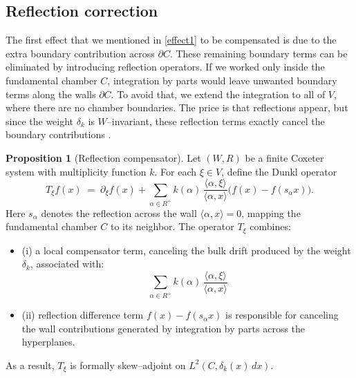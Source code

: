 \documentclass[12pt]{article}
\newcommand{\1}{\mathbbm{1}}
\theoremstyle{definition}
\newtheorem{proposition}{Proposition}
\begin{document}
\subsection{Reflection correction}
The first effect that we mentioned in \eqref{effect1} to be compensated is due to the extra boundary contribution across $\partial C$.
These remaining boundary terms can be eliminated by introducing reflection operators. If we worked only inside the fundamental chamber $C$, integration by parts would leave unwanted boundary terms along the walls $\partial C$. To avoid that, we extend the integration to all of $V$, where there are no chamber boundaries. The price is that reflections appear, but since the weight $\delta_k$ is $W$--invariant, these reflection terms exactly cancel the boundary contributions \cite{Dunkl1989,HeckmanOpdam1987,Rosler2003}.


\begin{proposition}[Reflection compensator]\label{prop:ReflectionCompensator}
Let $(W,R)$ be a finite Coxeter system with multiplicity function $k$.
For each $\xi \in V$, define the Dunkl operator
\begin{equation}\label{eq:DunklDef}
  T_{\xi} f(x) \;=\; \partial_{\xi} f(x)
   + \sum_{\alpha \in R^{+}} k(\alpha)\,
     \frac{\langle \alpha, \xi \rangle}{\langle \alpha,x\rangle}
     \big( f(x) - f(s_{\alpha}x) \big) .
\end{equation}
Here $s_{\alpha}$ denotes the reflection across the wall
$\langle \alpha, x \rangle = 0$, mapping the fundamental chamber $C$
to its neighbor. The operator $T_{\xi}$ combines:
\begin{itemize}
  \item (i) a local compensator term, canceling the bulk drift produced by the weight $\delta_k$, associated with:
  \[
    \sum_{\alpha \in R^+} k(\alpha)\,\frac{\langle \alpha,\xi\rangle}{\langle \alpha,x\rangle}
  \]
  \item (ii) reflection difference term $f(x) - f(s_\alpha x)$ is responsible for canceling the wall contributions generated by integration by parts across the hyperplanes. 
\end{itemize}
\noindent
As a result, $T_{\xi}$ is formally skew--adjoint on $L^{2}(C,\delta_{k}(x)\,dx)$.
\end{proposition}
\end{document}
